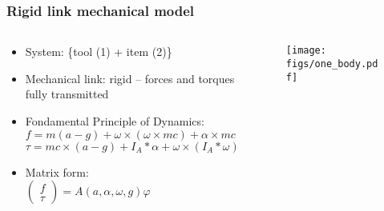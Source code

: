 \documentclass[aspectratio=1610]{beamer}
\begin{document}
\begin{frame}
\frametitle{Rigid link mechanical model}
\begin{columns}
\begin{column}{0.5\textwidth}
  \begin{itemize}\itemsep1em
    \justifying
    \item System: \{tool (1) + item (2)\}
    \item Mechanical link: rigid – forces and torques fully transmitted
    \item Fondamental Principle of Dynamics: \\
    \vspace{0.3cm}
      $f = m (a - g) + \omega \times (\omega \times m c) + \alpha \times m c$ \\
      $\tau = m c \times (a - g)
      + I_{A} \ast \alpha + \omega \times (I_{A} \ast \omega)$
    \item Matrix form: \\
    \vspace{0.5cm}
    $\begin{pmatrix}
      f    \\
      \tau
     \end{pmatrix}
     = A(a, \alpha, \omega, g) \varphi$

  \end{itemize}
\end{column}
\begin{column}{0.5\textwidth}  %
  \begin{figure}
    \centering
    \texttt{[image: figs/one\_body.pdf]}
  \end{figure}
\end{column}
\end{columns}

\end{frame}
\end{document}
